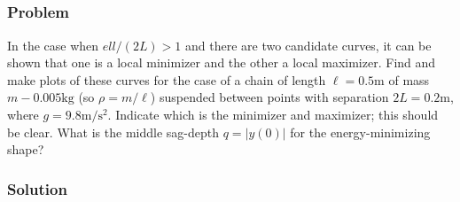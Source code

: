 \documentclass[12pt,twoside]{article}
\begin{document}
\subsection{}
\subsubsection*{Problem}
In the case when $ell/(2L)>1$ and there are two candidate curves, it can be
shown that one is a local minimizer and the other a local maximizer. Find and
make plots of these curves for the case of a chain of length $\ell=0.5\text{m}$
of mass $m-0.005\text{kg}$ (so $\rho=m/\ell$) suspended between points with
separation $2L=0.2\text{m}$, where $g=9.8\text{m/s$^2$}$. Indicate which is the
minimizer and maximizer; this should be clear. What is the middle sag-depth
$q=|y(0)|$ for the energy-minimizing shape?

\subsubsection*{Solution}
\todo{}
\end{document}
